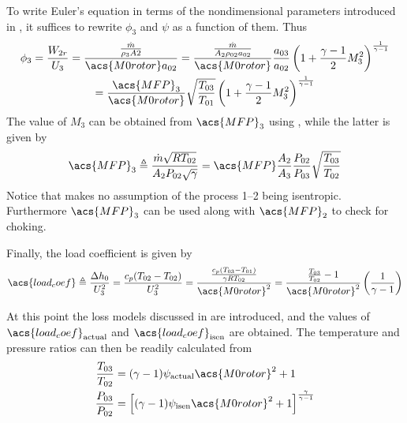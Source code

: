 To write Euler's equation  in terms of the nondimensional parameters introduced in , it suffices to rewrite $\phi_3$ and $\psi$ as a function of them. Thus
\begin{multline}
    \label{eqn:phi2_dimensionless}
    \phi_3 = \frac{W_{2r}}{U_3} 
           = \frac{\frac{\dot{m}}{\rho_3 A2}}{\acs{M0rotor} a_{02}}
           = \frac{\MFPalt{2}}{\acs{M0rotor}} \frac{a_{03}}{a_{02}} \stagdensratio{3} \\ 
           = \frac{\acs{MFP}_3}{\acs{M0rotor}} \sqrt{\frac{T_{03}}{T_{01}}} \stagdensratio{3}
\end{multline}
The value of $M_3$ can be obtained from $\acs{MFP}_3$ using , while the latter is given by
\begin{equation}
    \label{eqn:mfp2mfp2}
    \acs{MFP}_3 \triangleq \MFP{2} = \acs{MFP} \frac{A_2}{A_3} \frac{P_{02}}{P_{03}} \sqrt{\frac{T_{03}}{T_{02}}}
\end{equation}
Notice that  makes no assumption of the process 1--2 being isentropic. Furthermore $\acs{MFP}_3$ can be used along with $\acs{MFP}_2$ to check for choking.

Finally, the load coefficient is given by
\begin{equation}
    \acs{load_coef}\triangleq \frac{\Delta h_0}{U_3^2}
                      = \frac{c_p(T_{02}-T_{02})}{U_3^2}
                      = \frac{\frac{c_p(T_{03}-T_{01})}{\gamma R T_{02}}}
                                    {\acs{M0rotor}^2}
                      = \frac{\frac{T_{03}}{T_{02}}-1}
                                  {\acs{M0rotor}^2}
                        \left(\frac{1}{\gamma-1}\right)
\end{equation}

At this point the loss models discussed in  are introduced, 
and the values of $\acs{load_coef}_{\text{actual}}$ and $\acs{load_coef}_{\text{isen}}$ are obtained.
The temperature and pressure ratios can then be readily calculated from
\begin{align}
    \label{eqn:psi2Tratio}
    \frac{T_{03}}{T_{02}} &= (\gamma - 1)\psi_{\text{actual}} \acs{M0rotor}^2 + 1 \\
    \label{eqn:psi2Pratio}
    \frac{P_{03}}{P_{02}} &= \left[(\gamma - 1)\psi_{\text{isen}} \acs{M0rotor}^2 + 1\right]^\frac{\gamma}{\gamma-1}
\end{align}

